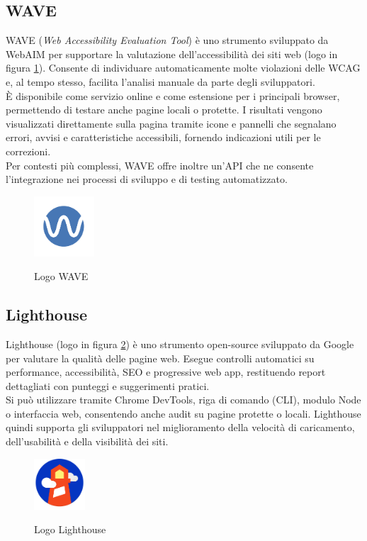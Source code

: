 \subsection{WAVE}
\label{subsec:wave}
\noindent WAVE (\textit{Web Accessibility Evaluation Tool}) è uno strumento sviluppato da WebAIM per supportare la valutazione dell’accessibilità dei siti web (logo in figura \ref{fig:logo_wave}). Consente di individuare automaticamente molte violazioni delle WCAG e, al tempo stesso, facilita l’analisi manuale da parte degli sviluppatori.\\ È disponibile come servizio online e come estensione per i principali browser, permettendo di testare anche pagine locali o protette. I risultati vengono visualizzati direttamente sulla pagina tramite icone e pannelli che segnalano errori, avvisi e caratteristiche accessibili, fornendo indicazioni utili per le correzioni. \\Per contesti più complessi, WAVE offre inoltre un’API che ne consente l’integrazione nei processi di sviluppo e di testing automatizzato.
\begin{figure}[H]
    \centering
    \includegraphics[width=0.2\textwidth, alt={Logo WAVE}]{img/wave.png}
    \caption[Logo WAVE]{Logo WAVE}\label{fig:logo_wave}
\end{figure}

\subsection{Lighthouse}
\label{subsec:lighthouse}
\noindent Lighthouse (logo in figura \ref{fig:logo_lighthouse}) è uno strumento open-source sviluppato da Google per valutare la qualità delle pagine web. Esegue controlli automatici su performance, accessibilità, SEO e progressive web app, restituendo report dettagliati con punteggi e suggerimenti pratici. \\Si può utilizzare tramite Chrome DevTools, riga di comando (CLI), modulo Node o interfaccia web, consentendo anche audit su pagine protette o locali. Lighthouse quindi supporta gli sviluppatori nel miglioramento della velocità di caricamento, dell’usabilità e della visibilità dei siti.
\begin{figure}[H]
    \centering
    \includegraphics[width=0.17\textwidth, alt={Logo Lighthouse}]{img/lighthouse.png}
    \caption[Logo Lighthouse]{Logo Lighthouse}\label{fig:logo_lighthouse}
\end{figure}
\newpage